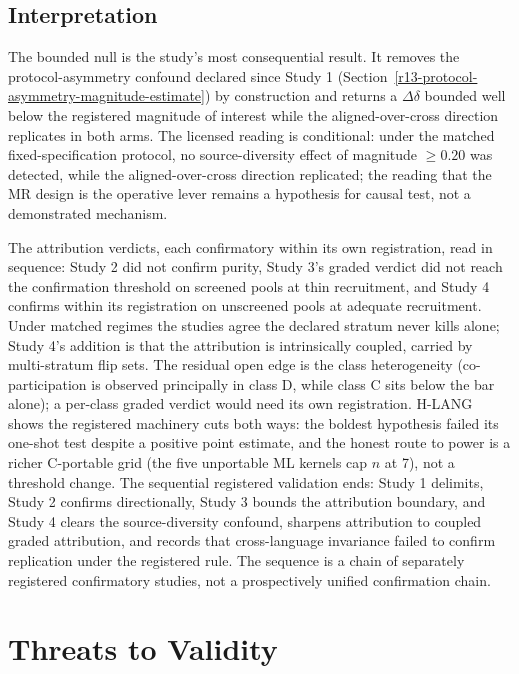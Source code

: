 \documentclass[manuscript,screen,review]{acmart}
\begin{document}
\subsection{Interpretation}\label{study4-interpretation}

The bounded null is the study's most consequential result. It removes the
protocol-asymmetry confound declared since Study 1
(Section~\ref{r13-protocol-asymmetry-magnitude-estimate}) by construction and
returns a \(\Delta\delta\) bounded well below the registered magnitude of
interest while the aligned-over-cross direction replicates in both arms. The
licensed reading is conditional: under the matched fixed-specification
protocol, no source-diversity effect of magnitude \(\geq 0.20\) was detected,
while the aligned-over-cross direction replicated; the reading that the MR
design is the operative lever remains a hypothesis for causal test, not a
demonstrated mechanism.

The attribution verdicts, each confirmatory within its own registration, read
in sequence: Study 2 did not confirm purity, Study 3's graded verdict did not
reach the confirmation threshold on screened pools at thin recruitment, and
Study 4 confirms within its registration on unscreened pools at adequate
recruitment. Under matched regimes the studies agree the declared stratum
never kills alone; Study 4's addition is that the attribution is
intrinsically coupled, carried by multi-stratum flip sets. The residual open
edge is the class heterogeneity (co-participation is observed principally in
class D, while class C sits below the bar alone); a per-class graded verdict
would need its own registration. H-LANG shows the registered machinery cuts
both ways: the boldest hypothesis failed its one-shot test despite a positive
point estimate, and the honest route to power is a richer C-portable grid
(the five unportable ML kernels cap \(n\) at 7), not a threshold change. The
sequential registered validation ends: Study 1
delimits, Study 2 confirms directionally, Study 3 bounds the attribution
boundary, and Study 4 clears the source-diversity confound, sharpens
attribution to coupled graded attribution, and records that cross-language
invariance failed to confirm replication under the registered rule. The
sequence is a chain of separately registered confirmatory studies, not a
prospectively unified confirmation chain.

\section{Threats to Validity}\label{threats-to-validity}
\end{document}
